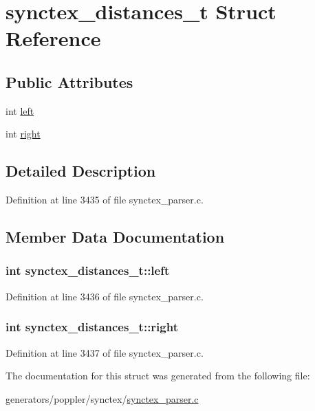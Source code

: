 \hypertarget{structsynctex__distances__t}{\section{synctex\+\_\+distances\+\_\+t Struct Reference}
\label{structsynctex__distances__t}
}
\subsection*{Public Attributes}
\begin{DoxyCompactItemize}
\item 
int \hyperlink{structsynctex__distances__t_ac03b2fb447b841c7cd1eaef882d9bb0e}{left}
\item 
int \hyperlink{structsynctex__distances__t_a4a9740a00d530e6c7b58eabe644a6d77}{right}
\end{DoxyCompactItemize}


\subsection{Detailed Description}


Definition at line 3435 of file synctex\+\_\+parser.\+c.



\subsection{Member Data Documentation}
\hypertarget{structsynctex__distances__t_ac03b2fb447b841c7cd1eaef882d9bb0e}{
\subsubsection[{left}]{\setlength{\rightskip}{0pt plus 5cm}int synctex\+\_\+distances\+\_\+t\+::left}}\label{structsynctex__distances__t_ac03b2fb447b841c7cd1eaef882d9bb0e}


Definition at line 3436 of file synctex\+\_\+parser.\+c.

\hypertarget{structsynctex__distances__t_a4a9740a00d530e6c7b58eabe644a6d77}{
\subsubsection[{right}]{\setlength{\rightskip}{0pt plus 5cm}int synctex\+\_\+distances\+\_\+t\+::right}}\label{structsynctex__distances__t_a4a9740a00d530e6c7b58eabe644a6d77}


Definition at line 3437 of file synctex\+\_\+parser.\+c.



The documentation for this struct was generated from the following file\+:\begin{DoxyCompactItemize}
\item 
generators/poppler/synctex/\hyperlink{synctex__parser_8c}{synctex\+\_\+parser.\+c}\end{DoxyCompactItemize}
